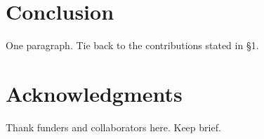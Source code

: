\documentclass[conference]{IEEEtran}
\begin{document}
\section{Conclusion}
One paragraph. Tie back to the contributions stated in \S1.

\section*{Acknowledgments}
Thank funders and collaborators here. Keep brief.




%
\end{document}
